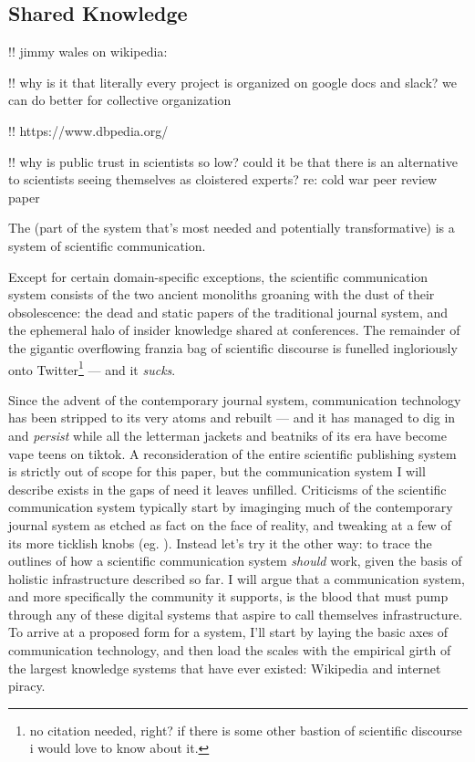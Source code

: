 \documentclass[11pt]{article}
\begin{document}
\hypertarget{shared-knowledge}{%
\subsection{Shared Knowledge}\label{shared-knowledge}}


\begin{multicols}{2}
 !! jimmy wales on wikipedia:

!! why is it that literally every project is organized on google docs
and slack? we can do better for collective organization

!! https://www.dbpedia.org/

!! why is public trust in scientists so low? could it be that there is
an alternative to scientists seeing themselves as cloistered experts?
re: cold war peer review paper

The (part of the system that's most needed and potentially
transformative) is a system of scientific communication.

Except for certain domain-specific exceptions, the scientific
communication system consists of the two ancient monoliths groaning with
the dust of their obsolescence: the dead and static papers of the
traditional journal system, and the ephemeral halo of insider knowledge
shared at conferences. The remainder of the gigantic overflowing franzia
bag of scientific discourse is funelled ingloriously onto
Twitter\footnote{no citation needed, right? if there is some other
  bastion of scientific discourse i would love to know about it.} ---
and it \emph{sucks}.

Since the advent of the contemporary journal system, communication
technology has been stripped to its very atoms and rebuilt --- and it
has managed to dig in and \emph{persist} while all the letterman jackets
and beatniks of its era have become vape teens on tiktok. A
reconsideration of the entire scientific publishing system is strictly
out of scope for this paper, but the communication system I will
describe exists in the gaps of need it leaves unfilled. Criticisms of
the scientific communication system typically start by imaginging much
of the contemporary journal system as etched as fact on the face of
reality, and tweaking at a few of its more ticklish knobs (eg. \cite{heesenPeerReviewGood2020} ). Instead let's try it the other way: to
trace the outlines of how a scientific communication system
\emph{should} work, given the basis of holistic infrastructure described
so far. I will argue that a communication system, and more specifically
the community it supports, is the blood that must pump through any of
these digital systems that aspire to call themselves infrastructure. To
arrive at a proposed form for a system, I'll start by laying the basic
axes of communication technology, and then load the scales with the
empirical girth of the largest knowledge systems that have ever existed:
Wikipedia and internet piracy.


\end{multicols}
\end{document}
